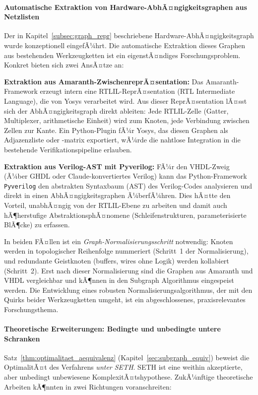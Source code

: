 ﻿\documentclass[12pt,a4paper]{report}
\begin{document}
\paragraph{Automatische Extraktion von Hardware-AbhÃ¤ngigkeitsgraphen aus Netzlisten}

Der in Kapitel~\ref{subsec:graph_repr} beschriebene Hardware-AbhÃ¤ngigkeitsgraph wurde
konzeptionell eingefÃ¼hrt. Die automatische Extraktion dieses Graphen aus bestehenden
Werkzeugketten ist ein eigenstÃ¤ndiges Forschungsproblem. Konkret bieten sich zwei
AnsÃ¤tze an:

\textbf{Extraktion aus Amaranth-ZwischenreprÃ¤sentation:} Das Amaranth-Framework
erzeugt intern eine RTLIL-ReprÃ¤sentation (RTL Intermediate Language), die von Yosys
verarbeitet wird. Aus dieser ReprÃ¤sentation lÃ¤sst sich der AbhÃ¤ngigkeitsgraph direkt
ableiten: Jede RTLIL-Zelle (Gatter, Multiplexer, arithmetische Einheit) wird zum
Knoten, jede Verbindung zwischen Zellen zur Kante. Ein Python-Plugin fÃ¼r Yosys, das
diesen Graphen als Adjazenzliste oder -matrix exportiert, wÃ¼rde die nahtlose Integration
in die bestehende Verifikationspipeline erlauben.

\textbf{Extraktion aus Verilog-AST mit Pyverilog:} FÃ¼r den VHDL-Zweig (Ã¼ber GHDL oder
Claude-konvertiertes Verilog) kann das Python-Framework \texttt{Pyverilog} den
abstrakten Syntaxbaum (AST) des Verilog-Codes analysieren und direkt in einen
AbhÃ¤ngigkeitsgraphen Ã¼berfÃ¼hren. Dies hÃ¤tte den Vorteil, unabhÃ¤ngig von der
RTLIL-Ebene zu arbeiten und damit auch hÃ¶herstufige AbstraktionsphÃ¤nomene
(Schleifenstrukturen, parameterisierte BlÃ¶cke) zu erfassen.

In beiden FÃ¤llen ist ein \emph{Graph-Normalisierungsschritt} notwendig: Knoten werden
in topologischer Reihenfolge nummeriert (Schritt~1 der Normalisierung), und redundante
Geistknoten (buffers, wires ohne Logik) werden kollabiert (Schritt~2). Erst nach dieser
Normalisierung sind die Graphen aus Amaranth und VHDL vergleichbar und kÃ¶nnen in den
Subgraph Algorithmus eingespeist werden. Die Entwicklung eines robusten
Normalisierungsalgorithmus, der mit den Quirks beider Werkzeugketten umgeht, ist
ein abgeschlossenes, praxisrelevantes Forschungsthema.

\paragraph{Theoretische Erweiterungen: Bedingte und unbedingte untere Schranken}

Satz~\ref{thm:optimalitaet_aequivalenz} (Kapitel~\ref{sec:subgraph_equiv}) beweist die
OptimalitÃ¤t des Verfahrens \emph{unter SETH}. SETH ist eine weithin akzeptierte, aber
unbedingt unbewiesene KomplexitÃ¤tshypothese. ZukÃ¼nftige theoretische Arbeiten kÃ¶nnten
in zwei Richtungen voranschreiten:
\end{document}
